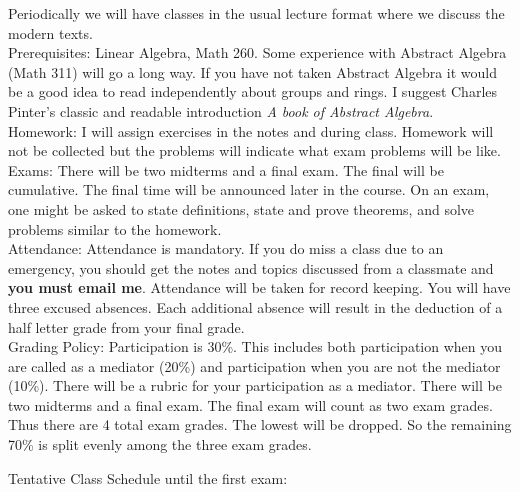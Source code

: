 \documentclass{article}
\begin{document}
	Periodically we will have classes in the usual lecture format where we discuss the modern texts.\\ 
	
	Prerequisites: Linear Algebra, Math 260. Some experience with Abstract Algebra (Math 311) will go a long way. If you have not taken Abstract Algebra it would be a good idea to read independently about groups and rings. I suggest Charles Pinter's classic and readable introduction \textit{A book of Abstract Algebra}. \\ 
	
	Homework: I will assign exercises in the notes and during class. Homework will not be collected but the problems will indicate what exam problems will be like. \\
	
	Exams: There will be two midterms and a final exam. The final will be cumulative. The final time will be announced later in the course. On an exam, one might be asked to state definitions, state and prove theorems, and solve problems similar to the homework.\\
	
	Attendance: Attendance is mandatory. If you do miss a class due to an emergency, you should get the notes and topics discussed from a classmate and \textbf{you must email me}. Attendance will be taken for record keeping. You will have three excused absences. Each additional absence will result in the deduction of a half letter grade from your final grade. \\
	
	Grading Policy: Participation is 30\%. This includes both participation when you are called as a mediator (20\%) and participation when you are not the mediator (10\%). There will be a rubric for your participation as a mediator. There will be two midterms and a final exam. The final exam will count as two exam grades. Thus there are 4 total exam grades. The lowest will be dropped. So the remaining 70\% is split evenly among the three exam grades.\\
	
\begin{center}	Tentative Class Schedule until the first exam: \end{center}
\end{document}
